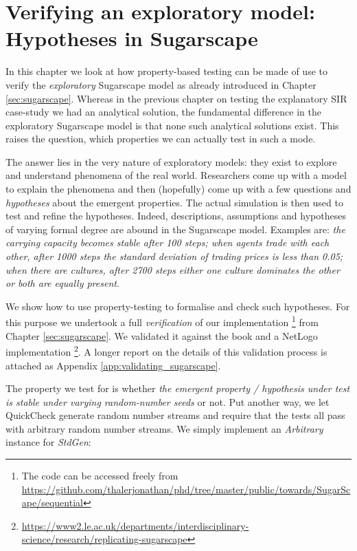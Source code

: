 \chapter{Verifying an exploratory model: \\ Hypotheses in Sugarscape}
\label{ch:prop_exploratory}
In this chapter we look at how property-based testing can be made of use to verify the \textit{exploratory} Sugarscape model \cite{epstein_growing_1996} as already introduced in Chapter \ref{sec:sugarscape}. Whereas in the previous chapter on testing the explanatory SIR case-study we had an analytical solution, the fundamental difference in the exploratory Sugarscape model is that none such analytical solutions exist. This raises the question, which properties we can actually test in such a mode.

The answer lies in the very nature of exploratory models: they exist to explore and understand phenomena of the real world. Researchers come up with a model to explain the phenomena and then (hopefully) come up with a few questions and  \textit{hypotheses} about the emergent properties. The actual simulation is then used to test and refine the hypotheses. Indeed, descriptions, assumptions and hypotheses of varying formal degree are abound in the Sugarscape model. Examples are: \textit{the carrying capacity becomes stable after 100 steps; when agents trade with each other, after 1000 steps the standard deviation of trading prices is less than 0.05; when there are cultures, after 2700 steps either one culture dominates the other or both are equally present}. 

We show how to use property-testing to formalise and check such hypotheses. For this purpose we undertook a full \textit{verification} of our implementation \footnote{The code can be accessed freely from \url{https://github.com/thalerjonathan/phd/tree/master/public/towards/SugarScape/sequential}} from Chapter \ref{sec:sugarscape}. We validated it against the book \cite{epstein_growing_1996} and a NetLogo implementation \cite{weaver_replicating_2009} \footnote{\url{https://www2.le.ac.uk/departments/interdisciplinary-science/research/replicating-sugarscape}}. A longer report on the details of this validation process is attached as Appendix \ref{app:validating_sugarscape}.

The property we test for is whether \textit{the emergent property / hypothesis under test is stable under varying random-number seeds} or not. Put another way, we let QuickCheck generate random number streams and require that the tests all pass with arbitrary random number streams. We simply implement an \textit{Arbitrary} instance for \textit{StdGen}:

